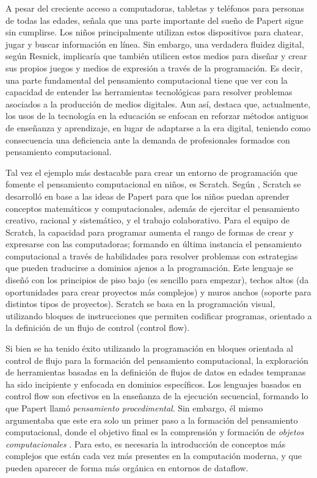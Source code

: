 A pesar del creciente acceso a computadoras, tabletas y teléfonos para personas de todas las edades,  señala que una parte importante del sueño de Papert sigue sin cumplirse. Los niños principalmente utilizan estos dispositivos para chatear, jugar y buscar información en línea. Sin embargo, una verdadera fluidez digital, según Resnick, implicaría que también utilicen estos medios para diseñar y crear sus propios juegos y medios de expresión a través de la programación. Es decir, una parte fundamental del pensamiento computacional tiene que ver con la capacidad de entender las herramientas tecnológicas para resolver problemas asociados a la producción de medios digitales. Aun así,  destaca que, actualmente, los usos de la tecnología en la educación se enfocan en reforzar métodos antiguos de enseñanza y aprendizaje, en lugar de adaptarse a la era digital, teniendo como consecuencia una deficiencia ante la demanda de profesionales formados con pensamiento computacional.

Tal vez el ejemplo más destacable para crear un entorno de programación que fomente el pensamiento computacional en niños, es Scratch. Según , Scratch se desarrolló en base a las ideas de Papert para que los niños puedan aprender conceptos matemáticos y computacionales, además de ejercitar el pensamiento creativo, racional y sistemático, y el trabajo colaborativo. Para el equipo de Scratch, la capacidad para programar aumenta el rango de formas de crear y expresarse con las computadoras; formando en última instancia el pensamiento computacional a través de habilidades para resolver problemas con estrategias que pueden traducirse a dominios ajenos a la programación. Este lenguaje se diseñó con los principios de piso bajo (es sencillo para empezar), techos altos (da oportunidades para crear proyectos más complejos) y muros anchos (soporte para distintos tipos de proyectos). Scratch se basa en la programación visual, utilizando bloques de instrucciones que permiten codificar programas, orientado a la definición de un flujo de control (control flow).

Si bien se ha tenido éxito utilizando la programación en bloques orientada al control de flujo para la formación del pensamiento computacional, la exploración de herramientas basadas en la definición de flujos de datos en edades tempranas ha sido incipiente y enfocada en dominios específicos. Los lenguajes basados en control flow son efectivos en la enseñanza de la ejecución secuencial, formando lo que Papert llamó \emph{pensamiento procedimental}. Sin embargo, él mismo argumentaba que este era solo un primer paso a la formación del pensamiento computacional, donde el objetivo final es la comprensión y formación de \emph{objetos computacionales} \cite[p.~894]{lodimartini2021}. Para esto, es necesaria la introducción de conceptos más complejos que están cada vez más presentes en la computación moderna, y que pueden aparecer de forma más orgánica en entornos de dataflow.

